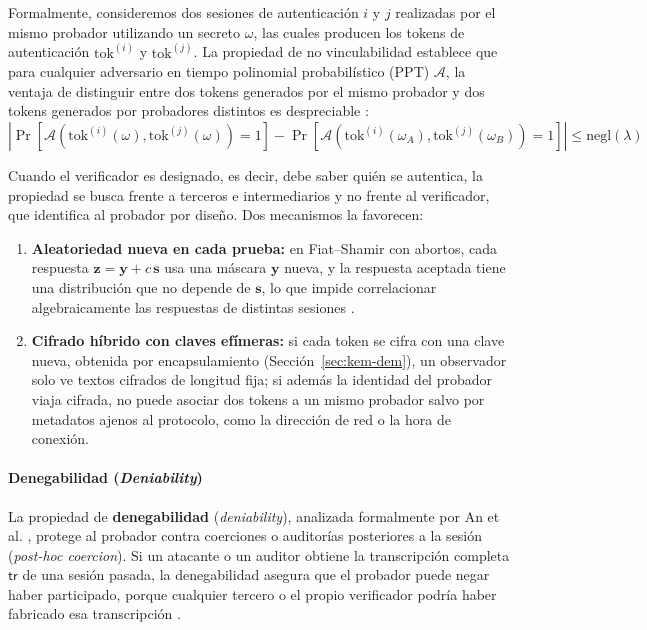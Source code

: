 Formalmente, consideremos dos sesiones de autenticación $i$ y $j$ realizadas por el mismo probador utilizando un secreto $\omega$, las cuales producen los tokens de autenticación $\text{tok}^{(i)}$ y $\text{tok}^{(j)}$. La propiedad de no vinculabilidad establece que para cualquier adversario en tiempo polinomial probabilístico (PPT) $\mathcal{A}$, la ventaja de distinguir entre dos tokens generados por el mismo probador y dos tokens generados por probadores distintos es despreciable \cite{ma2026laasso}:
\begin{equation}
\left| \Pr\left[ \mathcal{A}\left(\text{tok}^{(i)}(\omega), \text{tok}^{(j)}(\omega)\right) = 1 \right] - \Pr\left[ \mathcal{A}\left(\text{tok}^{(i)}(\omega_{A}), \text{tok}^{(j)}(\omega_{B})\right) = 1 \right] \right| \le \mathrm{negl}(\lambda)
\end{equation}

Cuando el verificador es designado, es decir, debe saber quién se autentica, la propiedad se busca frente a terceros e intermediarios y no frente al verificador, que identifica al probador por diseño. Dos mecanismos la favorecen:
\begin{enumerate}
    \item \textbf{Aleatoriedad nueva en cada prueba:} en Fiat--Shamir con abortos, cada respuesta $\mathbf{z} = \mathbf{y} + c\,\mathbf{s}$ usa una máscara $\mathbf{y}$ nueva, y la respuesta aceptada tiene una distribución que no depende de $\mathbf{s}$, lo que impide correlacionar algebraicamente las respuestas de distintas sesiones \cite{lyubashevsky2012lattice}.
    \item \textbf{Cifrado híbrido con claves efímeras:} si cada token se cifra con una clave nueva, obtenida por encapsulamiento (Sección~\ref{sec:kem-dem}), un observador solo ve textos cifrados de longitud fija; si además la identidad del probador viaja cifrada, no puede asociar dos tokens a un mismo probador salvo por metadatos ajenos al protocolo, como la dirección de red o la hora de conexión.
\end{enumerate}

\paragraph{Denegabilidad (\textit{Deniability})}
\label{sec:denegabilidad}
La propiedad de \textbf{denegabilidad} (\textit{deniability}), analizada formalmente por An et al. \cite{an2023secrethandshakes}, protege al probador contra coerciones o auditorías posteriores a la sesión (\textit{post-hoc coercion}). Si un atacante o un auditor obtiene la transcripción completa $\mathsf{tr}$ de una sesión pasada, la denegabilidad asegura que el probador puede negar haber participado, porque cualquier tercero o el propio verificador podría haber fabricado esa transcripción \cite{an2023secrethandshakes}.

